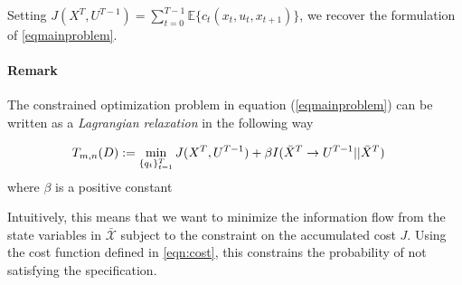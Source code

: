 

Setting $J(X^T,U^{T-1}) = \sum_{t=0}^{T-1}\mathbb{E}\{c_t(x_t,u_t,x_{t+1})\}$, we recover the formulation of \eqref{eqmainproblem}.

\paragraph*{Remark} The constrained optimization problem in equation (\ref{eqmainproblem}) can be written as a \emph{Lagrangian relaxation} in the following way

\begin{align}\label{eqn:constopt}
T_{m,n}(D) & := \min_{\{q_t\}_{t=1}^T}  J(X^{T},U^{T-1}) + \beta I(\bar{X}^T \rightarrow U^{T-1}||\bar{X}^T)
\end{align}
where $\beta$ is a positive constant

Intuitively, this means that we want to minimize the information flow from the state variables in $\mathcal{\bar{X}}$ subject to the constraint on the accumulated cost $J$. Using the cost function defined in \eqref{eqn:cost}, this constrains the probability of not satisfying the specification.


